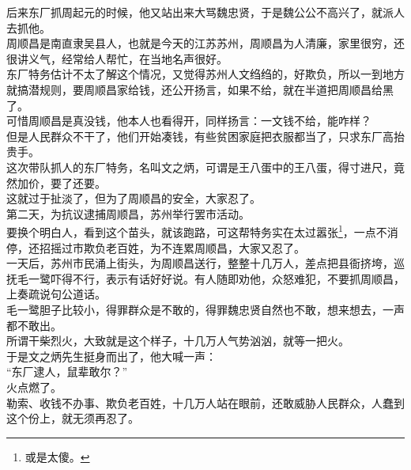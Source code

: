 \begin{multicols}{\theparacolNo}
后来东厂抓周起元的时候，他又站出来大骂魏忠贤，于是魏公公不高兴了，就派人去抓他。\\

周顺昌是南直隶吴县人，也就是今天的江苏苏州，周顺昌为人清廉，家里很穷，还很讲义气，经常给人帮忙，在当地名声很好。\\

东厂特务估计不太了解这个情况，又觉得苏州人文绉绉的，好欺负，所以一到地方就搞潜规则，要周顺昌家给钱，还公开扬言，如果不给，就在半道把周顺昌给黑了。\\

可惜周顺昌是真没钱，他本人也看得开，同样扬言：一文钱不给，能咋样？\\

但是人民群众不干了，他们开始凑钱，有些贫困家庭把衣服都当了，只求东厂高抬贵手。\\

这次带队抓人的东厂特务，名叫文之炳，可谓是王八蛋中的王八蛋，得寸进尺，竟然加价，要了还要。\\

这就过于扯淡了，但为了周顺昌的安全，大家忍了。\\

第二天，为抗议逮捕周顺昌，苏州举行罢市活动。\\

要换个明白人，看到这个苗头，就该跑路，可这帮特务实在太过嚣张\footnote{或是太傻。}，一点不消停，还招摇过市欺负老百姓，为不连累周顺昌，大家又忍了。\\

一天后，苏州市民涌上街头，为周顺昌送行，整整十几万人，差点把县衙挤垮，巡抚毛一鹭吓得不行，表示有话好好说。有人随即劝他，众怒难犯，不要抓周顺昌，上奏疏说句公道话。\\

毛一鹭胆子比较小，得罪群众是不敢的，得罪魏忠贤自然也不敢，想来想去，一声都不敢出。\\

所谓干柴烈火，大致就是这个样子，十几万人气势汹汹，就等一把火。\\

于是文之炳先生挺身而出了，他大喊一声：\\

“东厂逮人，鼠辈敢尔？”\\

火点燃了。\\

勒索、收钱不办事、欺负老百姓，十几万人站在眼前，还敢威胁人民群众，人蠢到这个份上，就无须再忍了。\\


\end{multicols}
